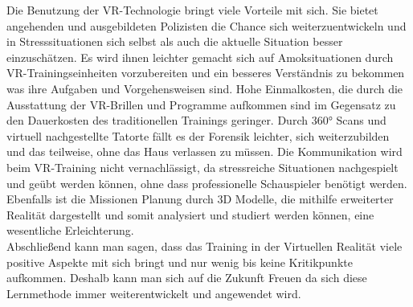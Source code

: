 Die Benutzung der VR-Technologie bringt viele Vorteile mit sich. Sie bietet angehenden und ausgebildeten Polizisten die Chance sich weiterzuentwickeln und in Stresssituationen sich selbst als auch die aktuelle Situation besser einzuschätzen. Es wird ihnen leichter gemacht sich auf Amoksituationen durch VR-Trainingseinheiten vorzubereiten und ein besseres Verständnis zu bekommen was ihre Aufgaben und Vorgehensweisen sind. Hohe Einmalkosten, die durch die Ausstattung der VR-Brillen und Programme aufkommen sind im Gegensatz zu den Dauerkosten des traditionellen Trainings geringer. Durch 360° Scans und virtuell nachgestellte Tatorte fällt es der Forensik leichter, sich weiterzubilden und das teilweise, ohne das Haus verlassen zu müssen. Die Kommunikation wird beim VR-Training nicht vernachlässigt, da stressreiche Situationen nachgespielt und geübt werden können, ohne dass professionelle Schauspieler benötigt werden. Ebenfalls ist die Missionen Planung durch 3D Modelle, die mithilfe erweiterter Realität dargestellt und somit analysiert und studiert werden können, eine wesentliche Erleichterung.
\\
Abschließend kann man sagen, dass das Training in der Virtuellen Realität viele positive Aspekte mit sich bringt und nur wenig bis keine Kritikpunkte aufkommen. Deshalb kann man sich auf die Zukunft Freuen da sich diese Lernmethode immer weiterentwickelt und angewendet wird.
